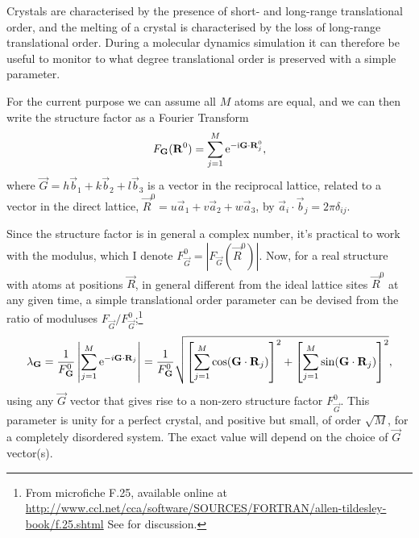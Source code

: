 \documentclass[11pt,bibliography=totoc,index=totoc]{scrbook}   %
\begin{document}

Crystals are characterised by the presence of short- and long-range translational order,
and the melting of a crystal is characterised by the loss of long-range translational order.
During a molecular dynamics simulation it can therefore be useful to monitor to what degree translational order is preserved with a simple parameter.

For the current purpose we can assume all $M$ atoms are equal, 
and we can then write the structure factor as\cite[241]{Martin:2004} a Fourier Transform
\begin{equation}
    F_{\boldsymbol{\mathrm{G}}}(\boldsymbol{\mathrm{R}}^0) = \sum_{j=1}^M \mathrm{e}^{-\mathrm{i}\boldsymbol{\mathrm{G}}\cdot\boldsymbol{\mathrm{R}}_j^0},
    \label{eq:structurefactor}
\end{equation}
where $\vec{G}=h\vec{b}_1 + k\vec{b}_2 + l\vec{b}_3$ is a vector in the reciprocal lattice, related to a 
vector in the direct lattice, $\vec{R}^{0} = u\vec{a}_1 + v\vec{a}_2 + w\vec{a}_3$, by $\vec{a}_i\cdot\vec{b}_j = 2\pi \delta_{ij}$.

Since the structure factor is in general a complex number, it's practical to work with the modulus, which I denote $F_{\vec{G}}^0 = |F_{\vec{G}}(\vec{R}^0)|$.
Now, for a real structure with atoms at positions $\vec{R}$, in general different from the ideal lattice sites $\vec{R}^0$ at any given time, 
a simple translational order parameter can be devised from the ratio of moduluses $F_{\vec{G}} / F_{\vec{G}}^0$;\footnote{From microfiche F.25, available online at
    \url{http://www.ccl.net/cca/software/SOURCES/FORTRAN/allen-tildesley-book/f.25.shtml} 
    See \cite[171]{Allen:1987} for discussion.}
\begin{equation}
    \lambda_{\boldsymbol{\mathrm{G}}} = \frac{1}{F_{\boldsymbol{\mathrm{G}}}^0}\left|\sum_{j=1}^M\mathrm{e}^{-i\boldsymbol{\mathrm{G}}\cdot\boldsymbol{\mathrm{R}}_j}\right| 
    = \frac{1}{F_{\boldsymbol{\mathrm{G}}}^0}\sqrt{\left[\sum_{j=1}^M\cos(\boldsymbol{\mathrm{G}}\cdot\boldsymbol{\mathrm{R}}_j)\right]^2 + \left[\sum_{j=1}^M\sin(\boldsymbol{\mathrm{G}}\cdot\boldsymbol{\mathrm{R}}_j)\right]^2},
  \label{eq:lattice_order_parameter}
\end{equation}
using any $\vec{G}$ vector that gives rise to a non-zero structure factor $F_{\vec{G}}^0$.
This parameter is unity for a perfect crystal, and positive but small, of order $\sqrt{M}$, for a completely disordered system. 
The exact value will depend on the choice of $\vec{G}$ vector(s).
\end{document}
